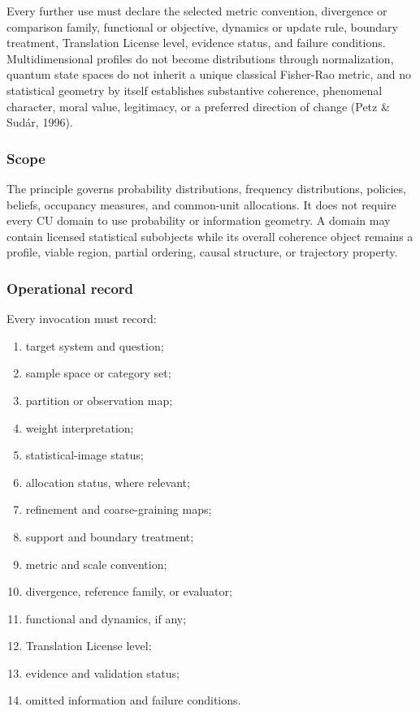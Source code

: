 \documentclass[
  11pt,
]{article}
\providecommand{\tightlist}{%
  \setlength{\itemsep}{0pt}\setlength{\parskip}{0pt}}
\begin{document}
Every further use must declare the selected metric convention,
divergence or comparison family, functional or objective, dynamics or
update rule, boundary treatment, Translation License level, evidence
status, and failure conditions. Multidimensional profiles do not become
distributions through normalization, quantum state spaces do not inherit
a unique classical Fisher-Rao metric, and no statistical geometry by
itself establishes substantive coherence, phenomenal character, moral
value, legitimacy, or a preferred direction of change (Petz \& Sudár,
1996).

\subsubsection{Scope}\label{scope-12}

The principle governs probability distributions, frequency
distributions, policies, beliefs, occupancy measures, and common-unit
allocations. It does not require every CU domain to use probability or
information geometry. A domain may contain licensed statistical
subobjects while its overall coherence object remains a profile, viable
region, partial ordering, causal structure, or trajectory property.

\subsubsection{Operational record}\label{operational-record}

Every invocation must record:

\begin{enumerate}
\def\labelenumi{\arabic{enumi}.}
\tightlist
\item
  target system and question;
\item
  sample space or category set;
\item
  partition or observation map;
\item
  weight interpretation;
\item
  statistical-image status;
\item
  allocation status, where relevant;
\item
  refinement and coarse-graining maps;
\item
  support and boundary treatment;
\item
  metric and scale convention;
\item
  divergence, reference family, or evaluator;
\item
  functional and dynamics, if any;
\item
  Translation License level;
\item
  evidence and validation status;
\item
  omitted information and failure conditions.
\end{enumerate}
\end{document}
